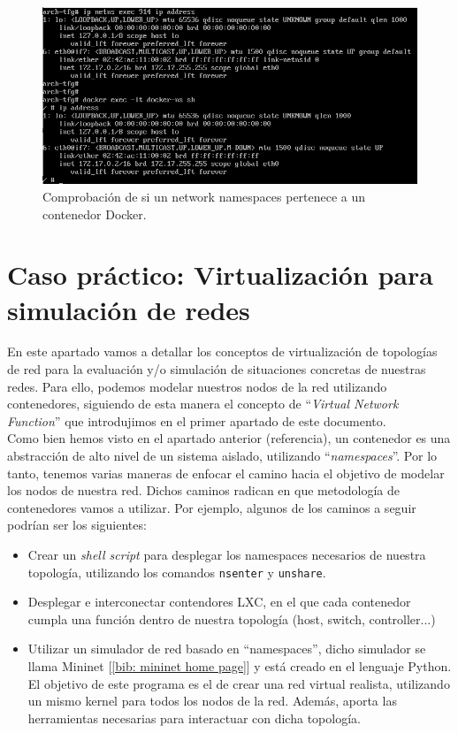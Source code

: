\documentclass[12pt]{article}
\begin{document}
	\begin{figure}[h!]
		\begin{center}
			\includegraphics[width=1\textwidth]{img/docker_ns4.png}
			\caption{Comprobación de si un network namespaces pertenece a un contenedor Docker.}
			\label{img: comprobacion ns docker}
		\end{center}
	\end{figure}
	
	\pagebreak

	\section{Caso práctico: Virtualización para simulación de redes}
	\noindent En este apartado vamos a detallar los conceptos de virtualización de topologías de red para la evaluación y/o simulación de situaciones concretas de nuestras redes. Para ello, podemos modelar nuestros nodos de la red utilizando contenedores, siguiendo de esta manera el concepto de ``\textit{Virtual Network Function}'' que introdujimos en el primer apartado de este documento. \\
	
	\noindent Como bien hemos visto en el apartado anterior (referencia), un contenedor es una abstracción de alto nivel de un sistema aislado, utilizando ``\textit{namespaces}''. Por lo tanto, tenemos varias maneras de enfocar el camino hacia el objetivo de modelar los nodos de nuestra red. Dichos caminos radican en que metodología de contenedores vamos a utilizar. Por ejemplo, algunos de los caminos a seguir podrían ser los siguientes:
	
	\begin{itemize}
		\item Crear un \textit{shell script} para desplegar los namespaces necesarios de nuestra topología, utilizando los comandos \texttt{nsenter} y \texttt{unshare}.
		\item Desplegar e interconectar contendores LXC, en el que cada contenedor cumpla una función dentro de nuestra topología (host, switch, controller...)
		\item Utilizar un simulador de red basado en ``namespaces'', dicho simulador se llama Mininet [\ref{bib: mininet home page}] y está creado en el lenguaje Python. El objetivo de este programa es el de crear una red virtual realista, utilizando un mismo kernel para todos los nodos de la red. Además, aporta las herramientas necesarias para interactuar con dicha topología.
	\end{itemize}
	
\end{document}
